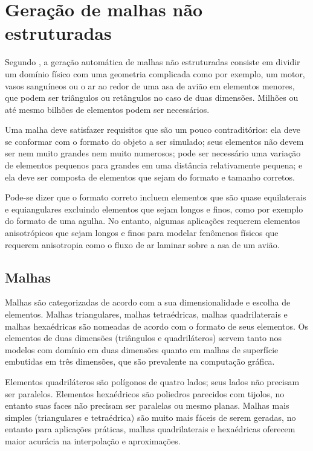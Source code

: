 \section{Geração de malhas não estruturadas}

Segundo \cite{Shewchuk1992}, a geração automática de malhas não estruturadas consiste em dividir um domínio físico com uma geometria complicada como por exemplo, um motor, vasos sanguíneos ou o ar ao redor de uma asa de avião em elementos menores, que podem ser triângulos ou retângulos no caso de duas dimensões. Milhões ou até mesmo bilhões de elementos podem ser necessários.

Uma malha deve satisfazer requisitos que são um pouco contraditórios: ela deve se conformar com o formato do objeto a ser simulado; seus elementos não devem ser nem muito grandes nem muito numerosos; pode ser necessário uma variação de elementos pequenos para grandes em uma distância relativamente pequena; e ela deve ser composta de elementos que sejam do formato e tamanho corretos.

Pode-se dizer que o formato correto incluem elementos que são quase equilaterais e equiangulares excluindo elementos que sejam longos e finos, como por exemplo do formato de uma agulha. No entanto, algumas aplicações requerem elementos anisotrópicos que sejam longos e finos para modelar fenômenos físicos que requerem anisotropia como o fluxo de ar laminar sobre a asa de um avião.

\subsection{Malhas}
Malhas são categorizadas de acordo com a sua dimensionalidade e escolha de elementos. Malhas triangulares, malhas tetraédricas, malhas quadrilaterais e malhas hexaédricas são nomeadas de acordo com o formato de seus elementos. Os elementos de duas dimensões (triângulos e quadriláteros) servem tanto nos modelos com domínio em duas dimensões quanto em malhas de superfície embutidas em três dimensões, que são prevalente na computação gráfica.

Elementos quadriláteros são polígonos de quatro lados; seus lados não precisam ser paralelos. Elementos hexaédricos são poliedros parecidos com tijolos, no entanto suas faces não precisam ser paralelas ou mesmo planas. Malhas mais simples (triangulares e tetraédrica) são muito mais fáceis de serem geradas, no entanto para aplicações práticas, malhas quadrilaterais e hexaédricas oferecem maior acurácia na interpolação e aproximações.


